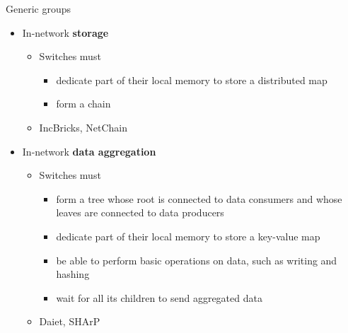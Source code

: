 \begin{frame}{Generic groups}
    
    \setcounter{footnote}{0}

    \vspace{2.5mm}

    \begin{itemize}
        \item In-network \textbf{storage}
        \begin{itemize}
        \item Switches must
        \begin{itemize}
            \item dedicate part of their local memory to store a distributed map
            \item form a chain
        \end{itemize}
        \item IncBricks\footnotemark{}, NetChain\footnotemark{}
        \end{itemize}
            \item In-network \textbf{data aggregation}
        \begin{itemize}
        \item Switches must
        \begin{itemize}
            \item form a tree whose root is connected to data consumers and whose leaves are connected to data producers
            \item dedicate part of their local memory to store a key-value map
            \item be able to perform basic operations on data, such as writing and hashing
            \item wait for all its children to send aggregated data
        \end{itemize}
        \item Daiet\footnotemark{}, SHArP\footnotemark{}
        \end{itemize}
    \end{itemize}

    \vspace{7.5mm}

    \setcounter{footnote}{1}
\end{frame}


